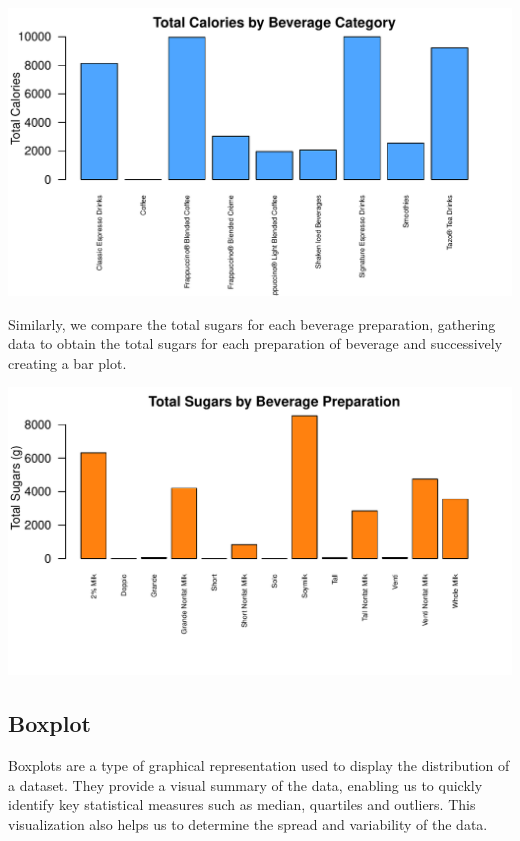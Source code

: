 \documentclass[
]{article}
\begin{document}
\begin{center}\includegraphics{Statistical_Learning_Final_Report_files/figure-latex/total_calories-1} \end{center}

Similarly, we compare the total sugars for each beverage preparation,
gathering data to obtain the total sugars for each preparation of
beverage and successively creating a bar plot.

\begin{center}\includegraphics{Statistical_Learning_Final_Report_files/figure-latex/total_sugars-1} \end{center}

\hypertarget{boxplot}{%
\subsection{Boxplot}\label{boxplot}}

Boxplots are a type of graphical representation used to display the
distribution of a dataset. They provide a visual summary of the data,
enabling us to quickly identify key statistical measures such as median,
quartiles and outliers. This visualization also helps us to determine
the spread and variability of the data.
\end{document}
